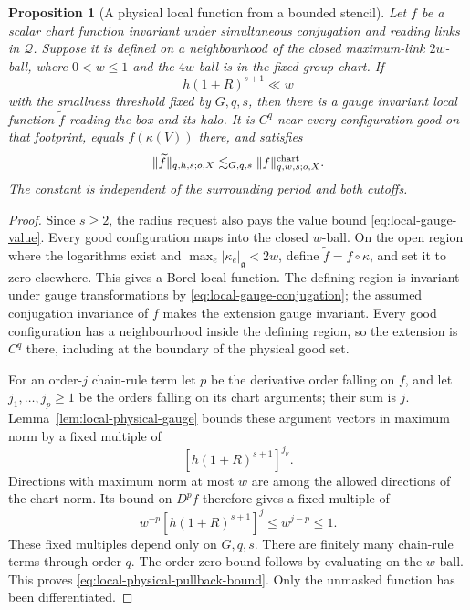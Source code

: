\documentclass[11pt,reqno]{amsart}
\numberwithin{equation}{section}
\newtheorem{proposition}[theorem]{Proposition}
\theoremstyle{definition}
\theoremstyle{remark}
\newcommand{\g}{\mathfrak g}
\begin{document}
\begin{proposition}[A physical local function from a bounded stencil]
\label{prop:local-physical-pullback}
Let \(f\) be a scalar chart function invariant
under simultaneous conjugation and reading links
in \(\mathcal Q\).
Suppose it is defined on a neighbourhood of the
closed maximum-link \(2w\)-ball, where \(0<w\le1\)
and the \(4w\)-ball is in the fixed group chart.
If
\begin{equation}
                   h(1+R)^{s+1}\ll w
 \label{eq:local-physical-radius-request}
\end{equation}
with the smallness threshold fixed by \(G,q,s\), then
there is a gauge invariant local function
\(\widetilde f\) reading the box and its halo.
It is \(C^q\) near every configuration good
on that footprint, equals \(f(\kappa(V))\)
there, and satisfies
\begin{equation}
              \|\widetilde f\|_{q,h,s;o,X}
                      \lesssim_{G,q,s}
                           \|f\|^{\rm chart}_{q,w,s;o,X}.
 \label{eq:local-physical-pullback-bound}
\end{equation}
The constant is independent of the surrounding
period and both cutoffs.
\end{proposition}
\begin{proof}
Since \(s\ge2\), the radius request also pays
the value bound \eqref{eq:local-gauge-value}.
Every good configuration maps into the closed
\(w\)-ball.
On the open region where the logarithms exist
and \(\max_e|\kappa_e|_{\g}<2w\), define
\(\widetilde f=f\circ\kappa\), and set it to
zero elsewhere.
This gives a Borel local function.
The defining region is invariant under gauge
transformations by
\eqref{eq:local-gauge-conjugation}; the assumed
conjugation invariance of \(f\) makes the
extension gauge invariant.
Every good configuration has a neighbourhood
inside the defining region, so the extension
is \(C^q\) there, including at the boundary
of the physical good set.

For an order-\(j\) chain-rule term let \(p\)
be the derivative order falling on \(f\), and
let \(j_1,\ldots,j_p\ge1\) be the orders
falling on its chart arguments; their sum is
\(j\).
Lemma~\ref{lem:local-physical-gauge} bounds
these argument vectors in maximum norm by a fixed multiple of
\[
                          [h(1+R)^{s+1}]^{j_\nu}.
\]
Directions with maximum norm at most \(w\)
are among the allowed directions of the chart
norm. Its bound on \(D^pf\) therefore gives a fixed
multiple of
\[
       w^{-p}[h(1+R)^{s+1}]^j
                       \le w^{j-p}\le1.
\]
These fixed multiples depend only on \(G,q,s\).
There are finitely many chain-rule terms
through order \(q\).
The order-zero bound follows by evaluating
on the \(w\)-ball.
This proves \eqref{eq:local-physical-pullback-bound}.
Only the unmasked function has been differentiated.
\end{proof}
\end{document}
